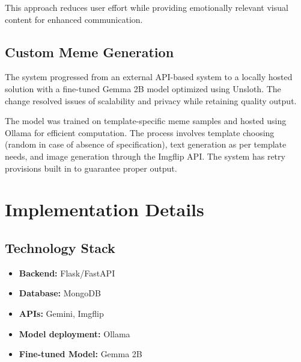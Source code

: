 \documentclass[conference]{IEEEtran}
\begin{document}
This approach reduces user effort while providing emotionally relevant visual content for enhanced communication.

\subsection{Custom Meme Generation}
The system progressed from an external API-based system to a locally hosted solution with a fine-tuned Gemma 2B model optimized using Unsloth. The change resolved issues of scalability and privacy while retaining quality output.

The model was trained on template-specific meme samples and hosted using Ollama for efficient computation. The process involves template choosing (random in case of absence of specification), text generation as per template needs, and image generation through the Imgflip API. The system has retry provisions built in to guarantee proper output.

% 

\section{Implementation Details}

\subsection{Technology Stack}
\begin{itemize}
    \item \textbf{Backend:} Flask/FastAPI
    \item \textbf{Database:} MongoDB
    \item \textbf{APIs:} Gemini, Imgflip
    \item \textbf{Model deployment:} Ollama
    \item \textbf{Fine-tuned Model:} Gemma 2B
\end{itemize}
\end{document}
